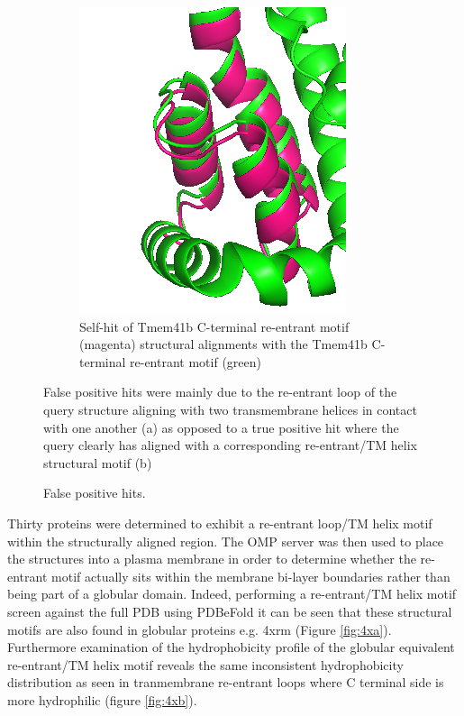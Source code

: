 \begin{figure}[htb]
\begin{subfigure}{0.3\textwidth}
  \includegraphics[width=\linewidth]{Pfam/tmb_w_tmb.png}
  \caption{Self-hit of Tmem41b C-terminal re-entrant motif (magenta) structural alignments with the Tmem41b C-terminal re-entrant motif (green)}
  \label{fig:self_hit}
\end{subfigure}
\caption{False positive hits. }
\small
False positive hits were mainly due to the re-entrant loop of the query structure aligning with two transmembrane helices in contact with one another (a) as opposed to a true positive hit where the query clearly has aligned with a corresponding re-entrant/TM helix structural motif (b)
\label{fig:hits}
\end{figure}

Thirty proteins were determined to exhibit a re-entrant loop/TM helix motif within the structurally aligned region.  The OMP server was then used to place the structures into a plasma membrane in order to determine whether the re-entrant motif actually sits within the membrane bi-layer boundaries rather than being part of a globular domain.  Indeed, performing a re-entrant/TM helix motif screen against the full PDB using PDBeFold \cite{krissinel2004secondary} it can be seen that these structural motifs are also found in globular proteins e.g. 4xrm (Figure \ref{fig:4xa}).  Furthermore examination of the hydrophobicity profile of the globular equivalent re-entrant/TM helix motif reveals the same inconsistent hydrophobicity distribution as seen in tranmembrane re-entrant loops where C terminal side is more hydrophilic (figure \ref{fig:4xb}).


